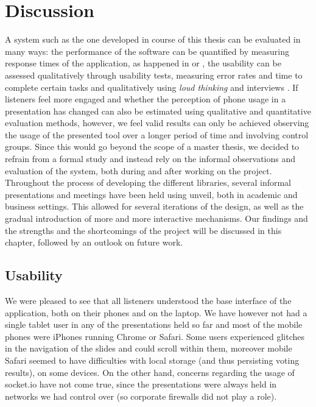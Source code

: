 \chapter{Discussion}
\label{cha:discussion}

A system such as the one developed in course of this thesis can be evaluated in many ways: the performance of the software can be quantified by measuring response times of the application, as happened in \cite{Niwa:Web-presentation-powerpoint} or \cite{Inoue:RealTimeQuestionnaire}, the usability can be assessed qualitatively through usability tests, measuring error rates and time to complete certain tasks and qualitatively using \emph{loud thinking} and interviews \cite{Reindl:automatisierte-user-interface-evaluierung}. If listeners feel more engaged and whether the perception of phone usage in a presentation has changed can also be estimated using qualitative and quantitative evaluation methods, however, we feel valid results can only be achieved observing the usage of the presented tool over a longer period of time and involving control groups. Since this would go beyond the scope of a master thesis, we decided to refrain from a formal study and instead rely on the informal observations and evaluation of the system, both during and after working on the project.
Throughout the process of developing the different libraries, several informal presentations and meetings have been held using unveil, both in academic and business settings. This allowed for several iterations of the design, as well as the gradual introduction of more and more interactive mechanisms. Our findings and the strengths and the shortcomings of the project will be discussed in this chapter, followed by an outlook on future work.

\section{Usability}
We were pleased to see that all listeners understood the base interface of the application, both on their phones and on the laptop. We have however not had a single tablet user in any of the presentations held so far and most of the mobile phones were iPhones running Chrome or Safari. Some users experienced glitches in the navigation of the slides and could scroll within them, moreover mobile Safari seemed to have difficulties with local storage (and thus persisting voting results), on some devices. On the other hand, concerns regarding the usage of socket.io have not come true, since the presentations were always held in networks we had control over (so corporate firewalls did not play a role).

